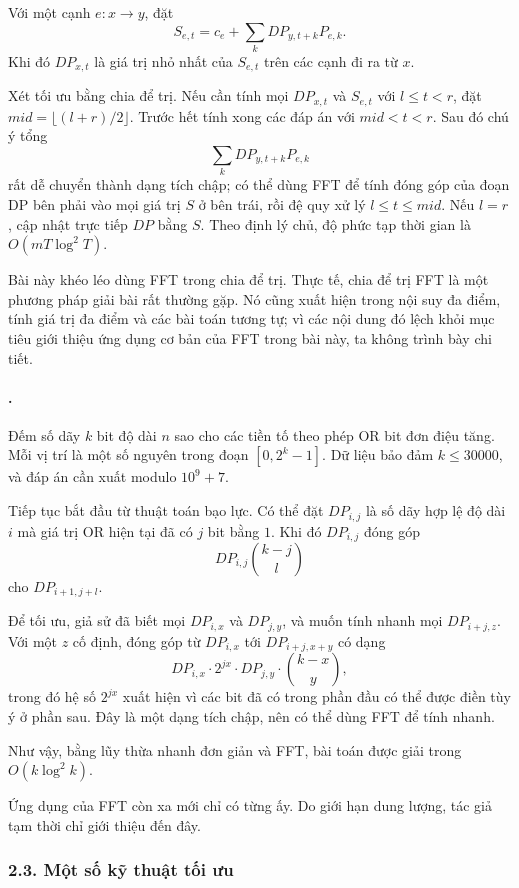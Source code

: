 \documentclass[11pt]{article}
\begin{document}
Với một cạnh \(e:x\to y\), đặt
\[
  S_{e,t}=c_e+\sum_k DP_{y,t+k}P_{e,k}.
\]
Khi đó \(DP_{x,t}\) là giá trị nhỏ nhất của \(S_{e,t}\) trên các cạnh đi ra
từ \(x\).

Xét tối ưu bằng chia để trị. Nếu cần tính mọi \(DP_{x,t}\) và \(S_{e,t}\) với
\(l\le t<r\), đặt \(mid=\lfloor(l+r)/2\rfloor\). Trước hết tính xong các đáp
án với \(mid<t<r\). Sau đó chú ý tổng
\[
  \sum_k DP_{y,t+k}P_{e,k}
\]
rất dễ chuyển thành dạng tích chập; có thể dùng FFT để tính đóng góp của đoạn
DP bên phải vào mọi giá trị \(S\) ở bên trái, rồi đệ quy xử lý \(l\le t\le
mid\). Nếu \(l=r\), cập nhật trực tiếp \(DP\) bằng \(S\). Theo định lý chủ,
độ phức tạp thời gian là \(O(mT\log^2T)\).

Bài này khéo léo dùng FFT trong chia để trị. Thực tế, chia để trị FFT là một
phương pháp giải bài rất thường gặp. Nó cũng xuất hiện trong nội suy đa điểm,
tính giá trị đa điểm và các bài toán tương tự; vì các nội dung đó lệch khỏi
mục tiêu giới thiệu ứng dụng cơ bản của FFT trong bài này, ta không trình bày
chi tiết.

\paragraph{.}
Đếm số dãy \(k\) bit độ dài \(n\) sao cho các tiền tố theo phép OR bit đơn
điệu tăng. Mỗi vị trí là một số nguyên trong đoạn \([0,2^k-1]\). Dữ liệu bảo
đảm \(k\le 30000\), và đáp án cần xuất modulo \(10^9+7\).

Tiếp tục bắt đầu từ thuật toán bạo lực. Có thể đặt \(DP_{i,j}\) là số dãy hợp
lệ độ dài \(i\) mà giá trị OR hiện tại đã có \(j\) bit bằng \(1\). Khi đó
\(DP_{i,j}\) đóng góp
\[
  DP_{i,j}\binom{k-j}{l}
\]
cho \(DP_{i+1,j+l}\).

Để tối ưu, giả sử đã biết mọi \(DP_{i,x}\) và \(DP_{j,y}\), và muốn tính nhanh
mọi \(DP_{i+j,z}\). Với một \(z\) cố định, đóng góp từ \(DP_{i,x}\) tới
\(DP_{i+j,x+y}\) có dạng
\[
  DP_{i,x}\cdot 2^{jx}\cdot DP_{j,y}\cdot \binom{k-x}{y},
\]
trong đó hệ số \(2^{jx}\) xuất hiện vì các bit đã có trong phần đầu có thể
được điền tùy ý ở phần sau. Đây là một dạng tích chập, nên có thể dùng FFT để
tính nhanh.

Như vậy, bằng lũy thừa nhanh đơn giản và FFT, bài toán được giải trong
\(O(k\log^2 k)\).

Ứng dụng của FFT còn xa mới chỉ có từng ấy. Do giới hạn dung lượng, tác giả
tạm thời chỉ giới thiệu đến đây.

\subsubsection*{2.3. Một số kỹ thuật tối ưu}
\end{document}
